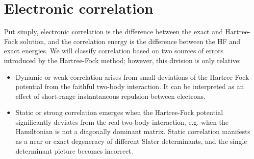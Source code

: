 \section{Electronic correlation
\label{sec:electronic_correlation}}

Put simply, electronic correlation is the difference between the exact and 
Hartree-Fock solution, and the correlation energy is the difference between 
the HF and exact energies. We will classify correlation based on two 
sources of errors introduced by the Hartree-Fock method; however, this division 
is only relative:

\begin{itemize}
\item Dynamic or weak correlation arises from small deviations of 
the Hartree-Fock potential from the faithful two-body interaction. It can be 
interpreted as an effect of short-range instantaneous repulsion between 
electrons.
\item Static or strong correlation emerges when the Hartree-Fock potential 
significantly deviates from the real two-body interaction, e.g. when the 
Hamiltonian is not a diagonally dominant matrix. Static correlation 
manifests as a near or exact degeneracy of different Slater determinants, and 
the single determinant picture becomes incorrect.
\end{itemize}

